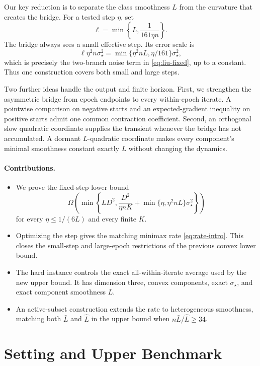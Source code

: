 \documentclass[twoside]{article}
\begin{document}
Our key reduction is to separate the class smoothness $L$ from the curvature
that creates the bridge. For a tested step $\eta$, set
\begin{equation}
 \ell=\min\left\{L,\frac{1}{161\eta n}\right\}.
 \label{eq:ell}
\end{equation}
The bridge always sees a small effective step. Its error scale is
\[
 \ell\eta^2n\sigma_\star^2
 =\min\{\eta^2nL,\eta/161\}\sigma_\star^2,
\]
which is precisely the two-branch noise term in
\eqref{eq:liu-fixed}, up to a constant. Thus one construction covers both
small and large steps.

Two further ideas handle the output and finite horizon. First, we strengthen
the asymmetric bridge from epoch endpoints to every within-epoch iterate. A
pointwise comparison on negative starts and an expected-gradient inequality
on positive starts admit one common contraction coefficient. Second, an
orthogonal slow quadratic coordinate supplies the transient whenever the
bridge has not accumulated. A dormant $L$-quadratic coordinate makes every
component's minimal smoothness constant exactly $L$ without changing the
dynamics.

\paragraph{Contributions.}
\begin{itemize}
\item We prove the fixed-step lower bound
\[
 \Omega\!\left(
 \min\!\left\{LD^2,\frac{D^2}{\eta nK}
 +\min\{\eta,\eta^2nL\}\sigma_\star^2\right\}\right)
\]
for every $\eta\le1/(6L)$ and every finite $K$.
\item Optimizing the step gives the matching minimax rate
\eqref{eq:rate-intro}. This closes the small-step and large-epoch restrictions
of the previous convex lower bound.
\item The hard instance controls the exact all-within-iterate average used by
the new upper bound. It has dimension three, convex components, exact
$\sigma_\star$, and exact component smoothness $L$.
\item An active-subset construction extends the rate to heterogeneous
smoothness, matching both $\bar L$ and $\widehat L$ in the upper bound when
$n\bar L/\widehat L\ge34$.
\end{itemize}

\section{Setting and Upper Benchmark}
\label{sec:setting}
\end{document}
